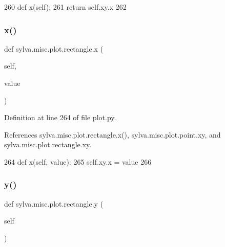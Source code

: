 \begin{DoxyCode}
260         \textcolor{keyword}{def }x(self):
261             \textcolor{keywordflow}{return} self.xy.x
262 
\end{DoxyCode}
\mbox{\label{classsylva_1_1misc_1_1plot_1_1rectangle_a94fe87f391637f1ddf6ab629ffea76a1}} 
\subsubsection{\texorpdfstring{x()}{x()}\hspace{0.1cm}{\footnotesize\ttfamily [2/2]}}
{\footnotesize\ttfamily def sylva.\+misc.\+plot.\+rectangle.\+x (\begin{DoxyParamCaption}\item[{}]{self,  }\item[{}]{value }\end{DoxyParamCaption})}



Definition at line 264 of file plot.\+py.



References sylva.\+misc.\+plot.\+rectangle.\+x(), sylva.\+misc.\+plot.\+point.\+xy, and sylva.\+misc.\+plot.\+rectangle.\+xy.


\begin{DoxyCode}
264         \textcolor{keyword}{def }x(self, value):
265             self.xy.x = value
266 
\end{DoxyCode}
\mbox{\label{classsylva_1_1misc_1_1plot_1_1rectangle_a3067088c7894de27d5a3338077ef027b}} 
\subsubsection{\texorpdfstring{y()}{y()}\hspace{0.1cm}{\footnotesize\ttfamily [1/2]}}
{\footnotesize\ttfamily def sylva.\+misc.\+plot.\+rectangle.\+y (\begin{DoxyParamCaption}\item[{}]{self }\end{DoxyParamCaption})}



